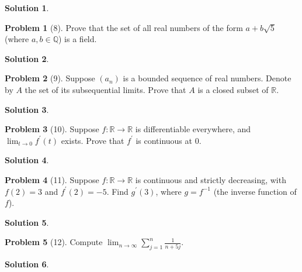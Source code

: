 \documentclass[12pt]{article}
\theoremstyle{definition} %
\newtheorem{solution}{Solution}
\newtheorem{problem}{Problem}
\theoremstyle{plain} %
\begin{document}
\begin{solution}
    
\end{solution}
\begin{problem}[8]
    Prove that the set of all real numbers of the form $a+b\sqrt{5} $ (where $a,b \in \mathbb{{Q}}$) is a field.   
\end{problem}
\begin{solution}
    
\end{solution}
\begin{problem}[9] 
    Suppose $(a_{n})$ is a bounded sequence of real numbers. Denote by $A$ the set of its subsequential limits. Prove that $A$ is a closed subset of $\mathbb{{R}}$.  
\end{problem}
\begin{solution}
    
\end{solution}
\begin{problem}[10]
    Suppose $f:\mathbb{{R}}\to \mathbb{{R}}$ is differentiable everywhere, and $\lim_{t \to 0} f^\prime (t)$ exists. Prove that $f^\prime$ is continuous at $0$.    
\end{problem}
\begin{solution}
    
\end{solution}
\begin{problem}[11]
    Suppose $f: \mathbb{{R}}\to \mathbb{{R}}$ is continuous and strictly decreasing, with $f(2)=3$ and $f^\prime (2)=-5$. Find $g^\prime (3)$, where $g=f^{-1}$ (the inverse function of $f$).     
\end{problem}
\begin{solution}
    
\end{solution}
\begin{problem}[12]
   Compute $\lim_{n \to \infty} \sum_{j=1}^{n} \frac{1}{n+5j}$.  
\end{problem}
\begin{solution}
    
\end{solution}
\end{document}
